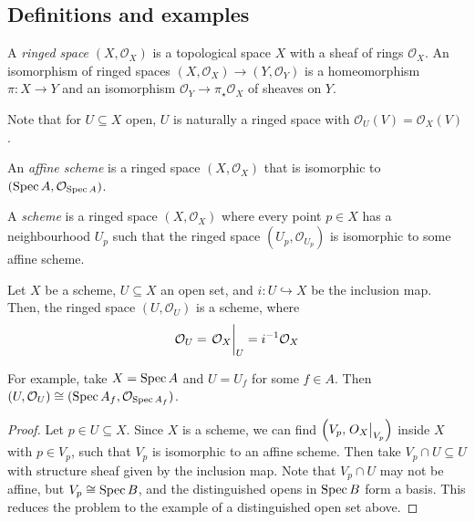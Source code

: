 \subsection{Definitions and examples}
\begin{definition}
    A \emph{ringed space} \( (X, \mathcal O_X) \) is a topological space \( X \) with a sheaf of rings \( \mathcal O_X \).
    An isomorphism of ringed spaces \( (X, \mathcal O_X) \to (Y, \mathcal O_Y) \) is a homeomorphism \( \pi : X \to Y \) and an isomorphism \( \mathcal O_Y \to \pi_\star \mathcal O_X \) of sheaves on \( Y \).
\end{definition}
Note that for \( U \subseteq X \) open, \( U \) is naturally a ringed space with \( \mathcal O_U(V) = \mathcal O_X(V) \).
\begin{definition}
    An \emph{affine scheme} is a ringed space \( (X, \mathcal O_X) \) that is isomorphic to \( (\operatorname{Spec} A, \mathcal O_{\operatorname{Spec} A}) \).
\end{definition}
\begin{definition}
    A \emph{scheme} is a ringed space \( (X, \mathcal O_X) \) where every point \( p \in X \) has a neighbourhood \( U_p \) such that the ringed space \( (U_p, \mathcal O_{U_p}) \) is isomorphic to some affine scheme.
\end{definition}
\begin{proposition}
    Let \( X \) be a scheme, \( U \subseteq X \) an open set, and \( i : U \hookrightarrow X \) be the inclusion map.
    Then, the ringed space \( (U, \mathcal O_U) \) is a scheme, where
    \[ \mathcal O_U = \eval{\mathcal O_X}_U = i^{-1} \mathcal O_X \]
\end{proposition}
For example, take \( X = \operatorname{Spec} A \) and \( U = U_f \) for some \( f \in A \).
Then \( (U, \mathcal O_U) \cong (\operatorname{Spec} A_f, \mathcal O_{\operatorname{Spec} A_f}) \).
\begin{proof}
    Let \( p \in U \subseteq X \).
    Since \( X \) is a scheme, we can find \( \qty(V_p, \eval{O_X}_{V_p}) \) inside \( X \) with \( p \in V_p \), such that \( V_p \) is isomorphic to an affine scheme.
    Then take \( V_p \cap U \subseteq U \) with structure sheaf given by the inclusion map.
    Note that \( V_p \cap U \) may not be affine, but \( V_p \cong \operatorname{Spec} B \), and the distinguished opens in \( \operatorname{Spec} B \) form a basis.
    This reduces the problem to the example of a distinguished open set above.
\end{proof}
